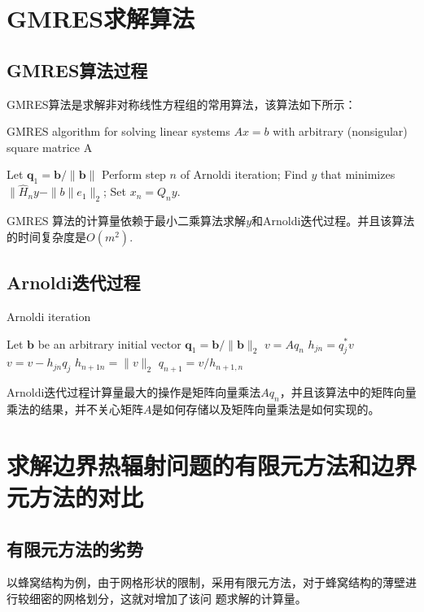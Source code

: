 \section{GMRES求解算法}
\subsection{GMRES算法过程}
GMRES算法是求解非对称线性方程组的常用算法，该算法如下所示：
\begin{algorithm}
	\caption{GMRES algorithm for solving linear systems $Ax=b$ with arbitrary (nonsigular) square matrice A}
	\begin{algorithmic}
		\STATE Let $\mathbf{q}_1 = \mathbf{b}/\|\mathbf{b}\|$ 
		\STATE Perform step $n$ of Arnoldi iteration;
		\STATE Find $y$ that minimizes $ \| \hat{H}_n y - \|b\|e_1\|_2$;
		\STATE Set $x_n=Q_n y$.
		\ENDFOR
	\end{algorithmic}
\end{algorithm}
\begin{remark}
	GMRES 算法的计算量依赖于最小二乘算法求解$y$和Arnoldi迭代过程。并且该算法的时间复杂度是$O(m^2)$.
\end{remark}
\subsection{Arnoldi迭代过程}
\begin{algorithm}
	\caption{Arnoldi iteration}
	\begin{algorithmic}
		\STATE Let $\mathbf{b}$ be an arbitrary initial vector
		\STATE $\mathit{\mathbf{q}}_1 = \mathbf{b}/\|\mathbf{b}\|_2$
		\FOR {$n = 1, 2, 3, . . .$}
		\STATE $v = Aq_n$
		\FOR {$j = 1 : n$}
		\STATE $h_{jn} = q^*_j v$
		\STATE $v = v − h_{jn}q_j$
		\ENDFOR
		\STATE $h_{n+1n} = \|v\|_2 $
		\STATE $q_{n+1} = v/h_{n+1,n}$
		\ENDFOR
	\end{algorithmic}
\end{algorithm}
\begin{remark}
	Arnoldi迭代过程计算量最大的操作是矩阵向量乘法$Aq_n$，并且该算法中的矩阵向量乘法的结果，并不关心矩阵$A$是如何存储以及矩阵向量乘法是如何实现的。
\end{remark}

\section{求解边界热辐射问题的有限元方法和边界元方法的对比}

\subsection{有限元方法的劣势}
以蜂窝结构为例，由于网格形状的限制，采用有限元方法，对于蜂窝结构的薄壁进行较细密的网格划分，这就对增加了该问
题求解的计算量。

